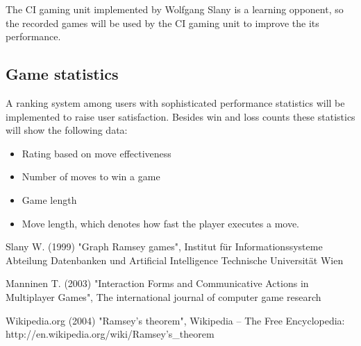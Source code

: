 		The CI gaming unit implemented by Wolfgang Slany is a learning opponent,
		so the recorded games will be used by the CI gaming unit to improve the
		its performance.

	\subsection{Game statistics}

		A ranking system among users with sophisticated performance statistics
		will be implemented to raise user satisfaction. Besides win and loss
		counts these statistics will show the following data:

		\begin{itemize}

			\item Rating based on move effectiveness

			\item Number of moves to win a game

			\item Game length

			\item Move length, which denotes how fast the player executes a move.

		\end{itemize}




\begin{thebibliography}{10}

	 Slany W. (1999) "Graph Ramsey games",
	Institut f\"ur Informationssysteme Abteilung Datenbanken und Artificial
	Intelligence Technische Universit\"at Wien

	 Manninen T. (2003) "Interaction Forms and
	Communicative Actions in Multiplayer Games", The international journal of
	computer game research

	 Wikipedia.org (2004) "Ramsey's theorem", Wikipedia --
	The Free Encyclopedia: http://en.wikipedia.org/wiki/Ramsey's\_theorem

\end{thebibliography}


